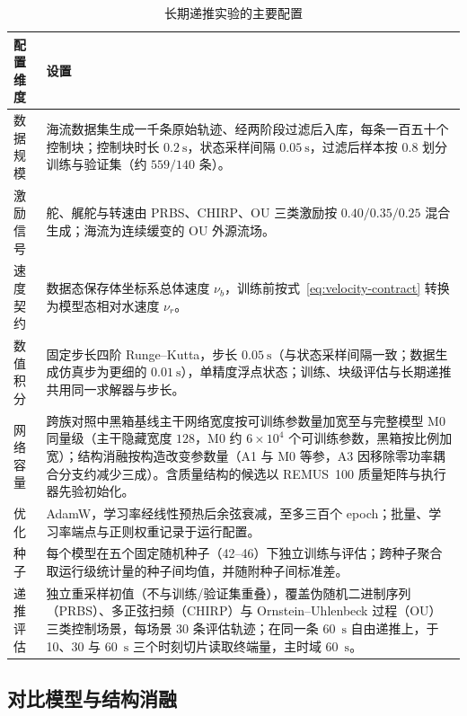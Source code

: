 \begin{table}[htbp]
  \centering
  \caption{长期递推实验的主要配置}
  \label{tab:experimental-config}
  \begin{tabularx}{\textwidth}{>{\raggedright\arraybackslash}p{}>{\raggedright\arraybackslash}X}
    \toprule
    配置维度 & 设置 \\
    \midrule
    数据规模 & 海流数据集生成一千条原始轨迹、经两阶段过滤后入库，每条一百五十个控制块；控制块时长 \(0.2~\mathrm{s}\)，状态采样间隔 \(0.05~\mathrm{s}\)，过滤后样本按 \(0.8\) 划分训练与验证集（约 \(559/140\) 条）。 \\
    激励信号 & 舵、艉舵与转速由 PRBS、CHIRP、OU 三类激励按 \(0.40/0.35/0.25\) 混合生成；海流为连续缓变的 OU 外源流场。 \\
    速度契约 & 数据态保存体坐标系总体速度 \(\nu_b\)，训练前按式~\eqref{eq:velocity-contract} 转换为模型态相对水速度 \(\nu_r\)。 \\
    数值积分 & 固定步长四阶 Runge--Kutta，步长 \(0.05~\mathrm{s}\)（与状态采样间隔一致；数据生成仿真步为更细的 \(0.01~\mathrm{s}\)），单精度浮点状态；训练、块级评估与长期递推共用同一求解器与步长。 \\
    网络容量 & 跨族对照中黑箱基线主干网络宽度按可训练参数量加宽至与完整模型 M0 同量级（主干隐藏宽度 \(128\)，M0 约 \(6\times10^4\) 个可训练参数，黑箱按比例加宽）；结构消融按构造改变参数量（A1 与 M0 等参，A3 因移除零功率耦合分支约减少三成）。含质量结构的候选以 REMUS~100 质量矩阵与执行器先验初始化。 \\
    优化 & AdamW，学习率经线性预热后余弦衰减，至多三百个 epoch；批量、学习率端点与正则权重记录于运行配置。 \\
    种子 & 每个模型在五个固定随机种子（42--46）下独立训练与评估；跨种子聚合取运行级统计量的种子间均值，并随附种子间标准差。 \\
    递推评估 & 独立重采样初值（不与训练/验证集重叠），覆盖伪随机二进制序列（PRBS）、多正弦扫频（CHIRP）与 Ornstein--Uhlenbeck 过程（OU）三类控制场景，每场景 30 条评估轨迹；在同一条 60~\(\mathrm{s}\) 自由递推上，于 10、30 与 60~\(\mathrm{s}\) 三个时刻切片读取终端量，主时域 60~\(\mathrm{s}\)。 \\
    \bottomrule
  \end{tabularx}
\end{table}

\subsection{对比模型与结构消融}
\label{subsec:models-ablations}

